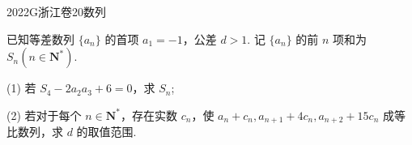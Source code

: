 
\begin{problem}{2022}{G}{浙江卷}{20}{数列}

已知等差数列 $\{a_n\}$ 的首项 $a_1=-1$，公差 $d>1$. 记 $\{a_n\}$ 的前 $n$ 项和为 $S_n(n \in \mathbf{N}^*)$.

(1) 若 $S_4-2a_2 a_3+6=0$，求 $S_n$;

(2) 若对于每个 $n \in \mathbf{N}^*$，存在实数 $c_n$，使 $a_n+c_n, a_{n+1}+4c_n, a_{n+2}+15c_n$ 成等比数列，求 $d$ 的取值范围.

\end{problem}